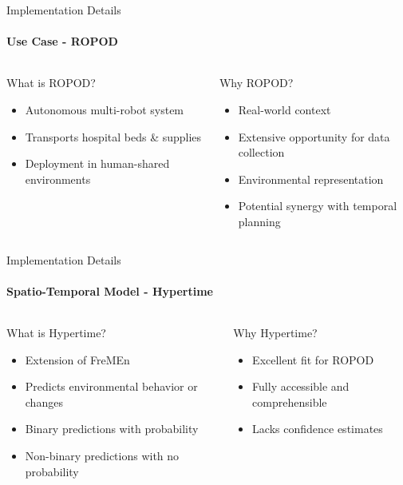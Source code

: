 \documentclass{beamer}
\begin{document}
\begin{frame}[t]{Implementation Details}
  \framesubtitle{Use Case - ROPOD}
  \begin{columns}[t]

    \begin{block}{What is ROPOD?}
      \begin{itemize}
        \item Autonomous multi-robot system
        \item Transports hospital beds \& supplies
        \item Deployment in human-shared environments
      \end{itemize}
    \end{block}

    \begin{block}{Why ROPOD?}
      \begin{itemize}
        \item Real-world context
        \item Extensive opportunity for data collection
        \item Environmental representation
        \item Potential synergy with temporal planning
      \end{itemize}
    \end{block}
  \end{columns}
\end{frame}



\begin{frame}[t]{Implementation Details}
  \framesubtitle{Spatio-Temporal Model - Hypertime \cite{Krajnik2018}}
  \begin{columns}[t]

    \begin{block}{What is Hypertime?}
      \begin{itemize}
        \item Extension of FreMEn \cite{Krajnik2015}
        \item Predicts environmental behavior or changes
        \item Binary predictions with probability
        \item Non-binary predictions with no probability
      \end{itemize}
    \end{block}

    \begin{block}{Why Hypertime?}
      \begin{itemize}
        \item Excellent fit for ROPOD \cite{Massey2019}
        \item Fully accessible and comprehensible
        \item Lacks confidence estimates
      \end{itemize}
    \end{block}
  \end{columns}
\end{frame}
\end{document}
